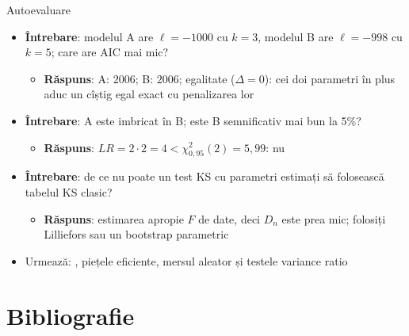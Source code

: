 \begin{frame}{Autoevaluare}
\itemsize{\small}
\begin{itemize}
    \item \textbf{Întrebare}: modelul A are $\ell = -1000$ cu $k = 3$, modelul B are $\ell = -998$ cu $k = 5$; care are AIC mai mic?
    \begin{itemize}
        \item \textbf{Răspuns}: A: $2006$; B: $2006$; egalitate ($\Delta = 0$): cei doi parametri în plus aduc un cîștig egal exact cu penalizarea lor
    \end{itemize}
    \item \textbf{Întrebare}: A este imbricat în B; este B semnificativ mai bun la 5\%?
    \begin{itemize}
        \item \textbf{Răspuns}: $LR = 2 \cdot 2 = 4 < \chi^2_{0{,}95}(2) = 5{,}99$: nu
    \end{itemize}
    \item \textbf{Întrebare}: de ce nu poate un test KS cu parametri estimați să folosească tabelul KS clasic?
    \begin{itemize}
        \item \textbf{Răspuns}: estimarea apropie $F$ de date, deci $D_n$ este prea mic; folosiți Lilliefors sau un bootstrap parametric
    \end{itemize}
    \item Urmează: , piețele eficiente, mersul aleator și testele variance ratio
\end{itemize}
\end{frame}


\section{Bibliografie}

